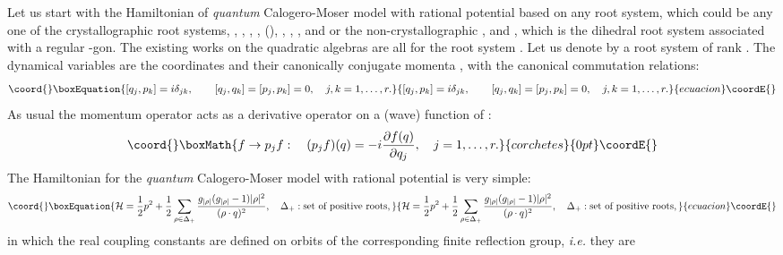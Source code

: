 \documentclass[a4paper,12pt]{article}
\begin{document}
Let us start with the Hamiltonian of {\em quantum} Calogero-Moser model
with rational potential based on any root system, which could be any
one of the crystallographic root systems, \coordHE{}, \coordHE{}, \coordHE{},
\coordHE{}, (\coordHE{}), \coordHE{}, \coordHE{}, \coordHE{}, \coordHE{} and \coordHE{}
or the non-crystallographic \coordHE{}, \coordHE{} and \coordHE{}, which is the
dihedral root system associated with a regular \coordHE{}-gon.
The existing works on the quadratic algebras are all for the \coordHE{}
root system \cite{Kuz, UjWa, Gonera1}.
Let us denote by \myHighlight{$\Delta$}\coordHE{} a root system of rank \coordHE{}. The
dynamical variables are  the coordinates \coordHE{} and their canonically conjugate momenta \coordHE{},  with
the canonical commutation relations:
\begin{equation}\coord{}\boxEquation{
   [q_{j},p_{k}]=i\delta_{jk},\qquad [q_{j},q_{k}]=
   [p_{j},p_{k}]=0,\quad j,k=1,\ldots,r.
}{
   [q_{j},p_{k}]=i\delta_{jk},\qquad [q_{j},q_{k}]=
   [p_{j},p_{k}]=0,\quad j,k=1,\ldots,r.
}{ecuacion}\coordE{}\end{equation}
As usual the momentum operator \coordHE{} acts as a derivative operator
on a (wave) function \coordHE{} of \coordHE{}:
\[\coord{}\boxMath{
  f\to p_jf: \quad (p_jf)(q)=-i{\partial f(q)\over{\partial q_j}},
  \quad j=1,\ldots,r.
}{corchetes}{0pt}\coordE{}\]
The Hamiltonian for the {\em quantum} Calogero-Moser model  with
rational potential is very simple:
\begin{equation}\coord{}\boxEquation{
    {\cal H}={1\over2}p^2+
    {1\over2}\sum_{\rho\in\Delta_+}
   {g_{|\rho|}(g_{|\rho|}-1)|\rho|^{2}\over{(\rho\cdot q)^2}},
   \quad \Delta_+: \mbox{set of positive roots},
   \label{ratHam}
}{
    {\cal H}={1\over2}p^2+
    {1\over2}\sum_{\rho\in\Delta_+}
   {g_{|\rho|}(g_{|\rho|}-1)|\rho|^{2}\over{(\rho\cdot q)^2}},
   \quad \Delta_+: \mbox{set of positive roots},
   }{ecuacion}\coordE{}\end{equation}
in which the real coupling constants \coordHE{} are
defined on orbits of the corresponding
finite reflection  group, {\it i.e.} they are
\end{document}
